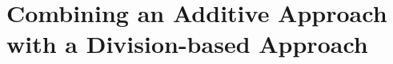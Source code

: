 \documentclass{article}
\theoremstyle{plain}
\theoremstyle{definition}
\theoremstyle{remark}
\begin{document}


\newpage

\section{Combining an Additive Approach with a Division-based Approach}
\end{document}

